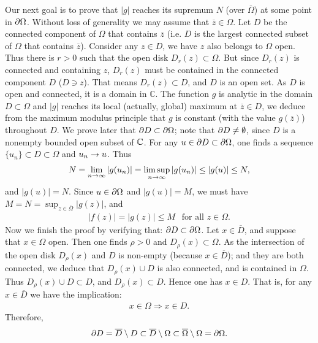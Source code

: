 \begin{problem}
\begin{solution}
Our next goal is to prove that $\left| g \right|$ reaches its supremum $N$ (over $\overline{\Omega}$) at some point in $\partial \Omega$. Without loss of generality we may assume that $\overline{z}\in \Omega$. Let $D$ be the connected component of $\Omega$ that contains $\overline{z}$ (i.e. $D$ is the largest connected subset of $\Omega$ that contains $\overline{z}$). Consider any $z\in D$, we have $z$ also belongs to $\Omega$ open. Thus there is $r>0$ such that the open disk $D_r(z) \subset \Omega$. But since $D_r(z)$ is connected and containing $z$, $D_r(z)$ must be contained in the connected component $D$ ($D \ni z$). That means $D_r(z) \subset D$, and $D$ is an open set. As $D$ is open and connected, it is a domain in $\mathbb{C}$. The function $g$ is analytic in the domain $D\subset \Omega$ and $\left|g\right|$ reaches its local (actually, global) maximum at $\overline{z} \in D$, we deduce from the maximum modulus principle that $g$ is constant (with the value $g(\overline{z})$) throughout $D$. We prove later that $\partial D \subset \partial \Omega$; note that $\partial D \neq \emptyset$, since $D$ is a nonempty bounded open subset of $\mathbb{C}$. For any $u\in \partial D \subset \partial \Omega$, one finds a sequence $\{u_n\} \subset D \subset \Omega$ and $u_n \rightarrow u$. Thus 
\begin{align*}
    N = \lim_{n\rightarrow \infty} |g(u_n)| =  \limsup_{n\rightarrow \infty} |g(u_n)| \le |g(u)| \le N,
\end{align*}
and $|g(u)| = N$. Since $u\in \partial \Omega$ and $|g(u)|=M$, we must have $M=N=\sup_{z\in \overline{\Omega}}|g(z)|$, and 
\begin{align*}
    |f(z)| = |g(z)| \le M \ \ \text{ for all } z\in \Omega.
\end{align*}
Now we finish the proof by verifying that: $\partial D \subset \partial \Omega$. Let $x\in \overline{D}$, and suppose that $x\in \Omega$ open. Then one finds $\rho >0$ and $D_{\rho}(x) \subset \Omega$. As the intersection of the open disk $D_{\rho}(x)$ and $D$ is non-empty (because $x\in \overline{D}$); and they are both connected, we deduce that $D_{\rho}(x) \cup D$ is also connected, and is contained in $\Omega$. Thus $D_{\rho}(x)\cup D \subset D$, and $D_{\rho}(x) \subset D$. Hence one has $x\in D$. That is, for any $x\in \overline{D}$ we have the implication:
\begin{align*}
    x\in \Omega \Longrightarrow x\in D.
\end{align*}
Therefore,
\begin{align*}
    \partial D = \overline{D} \setminus D \subset \overline{D} \setminus \Omega \subset \overline{\Omega} \setminus \Omega = \partial \Omega.
\end{align*}
\end{solution}
\end{problem}

